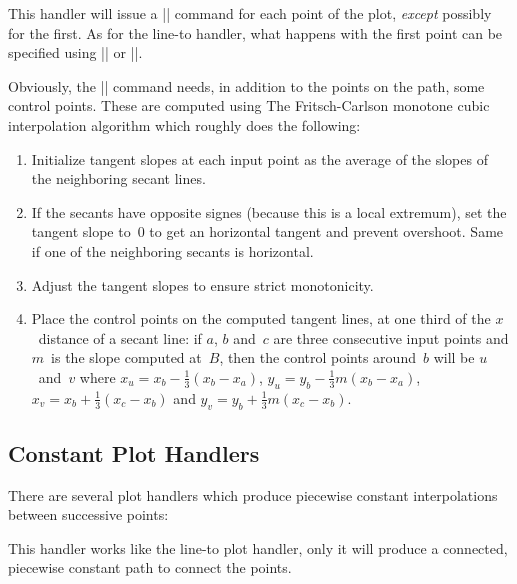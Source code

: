 \begin{command}{\pgfplothandlermonotone}
    This handler will issue a |\pgfpathcurveto| command for each point of the
    plot, \emph{except} possibly for the first. As for the line-to handler,
    what happens with the first point can be specified using
    |\pgfsetmovetofirstplotpoint| or |\pgfsetlinetofirstplotpoint|.

    Obviously, the |\pgfpathcurveto| command needs, in addition to the points
    on the path, some control points. These are computed using The
    Fritsch-Carlson monotone cubic interpolation algorithm which roughly does
    the following:

    \begin{enumerate}
        \item Initialize tangent slopes at each input point as the
            average of the slopes of the neighboring secant lines.
        \item If the secants have opposite signes (because this is a local
            extremum), set the tangent slope to~$0$ to get an horizontal
            tangent and prevent overshoot. Same if one of the neighboring
            secants is horizontal.
        \item Adjust the tangent slopes to ensure strict monotonicity.
        \item Place the control points on the computed tangent lines,
            at one third of the $x$~distance of a secant line: if $a$, $b$
            and~$c$ are three consecutive input points and $m$~is the
            slope computed at~$B$, then the control points around~$b$ will
            be $u$~and~$v$ where $x_u = x_b - \frac{1}{3}(x_b-x_a)$,
            $y_u = y_b - \frac{1}{3} m (x_b-x_a)$,
            $x_v = x_b + \frac{1}{3}(x_c-x_b)$ and
            $y_v = y_b + \frac{1}{3} m (x_c-x_b)$.
    \end{enumerate}
\end{command}



\subsection{Constant Plot Handlers}

There are several plot handlers which produce piecewise constant interpolations
between successive points:

\begin{command}{\pgfplothandlerconstantlineto}
    This handler works like the line-to plot handler, only it will produce a
    connected, piecewise constant path to connect the points.
\begin{codeexample}[]
\end{codeexample}
\end{command}

